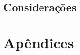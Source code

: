 \documentclass[a4paper,12pt,twoside,openright]{scrreprt}
\begin{document}
\chapter{Considerações}



\cleardoublepage
{} {}
 \label{chap.refs} %
\renewcommand{\bibname}{Referências Bibliográficas} 
\renewcommand{\refname}{\bibname} 

%
%
%
%
%

%
%



\cleardoublepage
{} \appendix


\part{Apêndices}
\cleardoublepage

%

%
%
%
%
\end{document}
